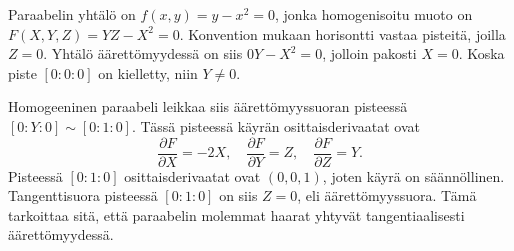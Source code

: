 \begin{esimerkki}
    Paraabelin yhtälö on $f(x,y)=y-x^2=0$, jonka homogenisoitu muoto on $F(X,Y,Z)=YZ-X^2=0$. Konvention mukaan horisontti vastaa pisteitä, joilla $Z=0$. Yhtälö äärettömyydessä on siis $0Y-X^2=0$, jolloin pakosti $X=0$. Koska piste $[0:0:0]$ on kielletty, niin $Y\ne0$.

    Homogeeninen paraabeli leikkaa siis äärettömyyssuoran pisteessä $[0:Y:0]\sim[0:1:0]$. Tässä pisteessä käyrän osittaisderivaatat ovat
    \begin{equation*}
        \frac{\partial F}{\partial X} = -2X,\quad
        \frac{\partial F}{\partial Y} = Z,\quad
        \frac{\partial F}{\partial Z} = Y.
    \end{equation*}
    Pisteessä $[0:1:0]$ osittaisderivaatat ovat $(0,0,1)$, joten käyrä on säännöllinen. Tangenttisuora pisteessä $[0:1:0]$ on siis $Z=0$, eli äärettömyyssuora. Tämä tarkoittaa sitä, että paraabelin molemmat haarat yhtyvät tangentiaalisesti äärettömyydessä.
\end{esimerkki}

